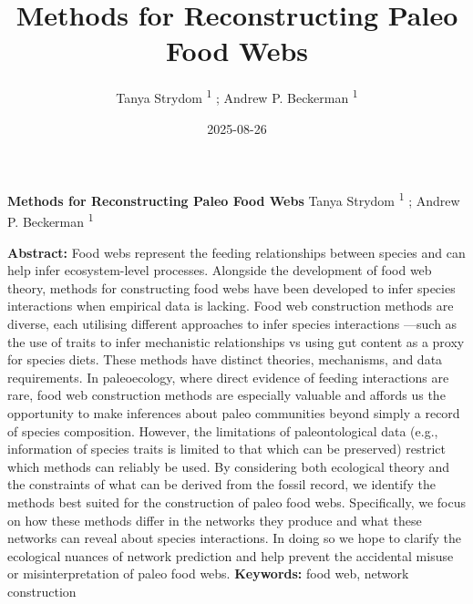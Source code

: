 \documentclass[
]{article}
\title{Methods for Reconstructing Paleo Food Webs}
\author{Tanya Strydom %
%
\textsuperscript{%
%
1%
}%
; Andrew P. Beckerman %
%
\textsuperscript{%
%
1%
}%
}
\date{2025-08-26}
\begin{document}
\thispagestyle{empty}
{\bfseries\sffamily\Large Methods for Reconstructing Paleo Food Webs}
\vfil
Tanya Strydom %
%
\textsuperscript{%
%
1%
}%
; Andrew P. Beckerman %
%
\textsuperscript{%
%
1%
}%

\vfil
{\small
\textbf{Abstract:} Food webs represent the feeding relationships between
species and can help infer ecosystem-level processes. Alongside the
development of food web theory, methods for constructing food webs have
been developed to infer species interactions when empirical data is
lacking. Food web construction methods are diverse, each utilising
different approaches to infer species interactions ---such as the use of
traits to infer mechanistic relationships vs using gut content as a
proxy for species diets. These methods have distinct theories,
mechanisms, and data requirements. In paleoecology, where direct
evidence of feeding interactions are rare, food web construction methods
are especially valuable and affords us the opportunity to make
inferences about paleo communities beyond simply a record of species
composition. However, the limitations of paleontological data (e.g.,
information of species traits is limited to that which can be preserved)
restrict which methods can reliably be used. By considering both
ecological theory and the constraints of what can be derived from the
fossil record, we identify the methods best suited for the construction
of paleo food webs. Specifically, we focus on how these methods differ
in the networks they produce and what these networks can reveal about
species interactions. In doing so we hope to clarify the ecological
nuances of network prediction and help prevent the accidental misuse or
misinterpretation of paleo food webs.
\vfil
\textbf{Keywords:} %
food web, %
network construction%
}
\clearpage
\setcounter{page}{1}
\doublespacing
\linenumbers
\end{document}
